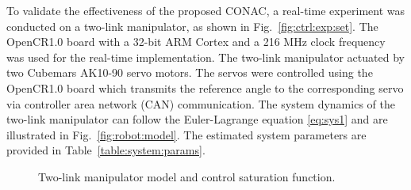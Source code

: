 \documentclass[lettersize,journal]{IEEEtran}
\begin{document}
To validate the effectiveness of the proposed CONAC, a real-time experiment was conducted on a two-link manipulator, as shown in Fig.~\ref{fig:ctrl:exp:set}. 
The OpenCR1.0 board \cite{opencr} with a 32-bit ARM Cortex and a 216 MHz clock frequency was used for the real-time implementation.
The two-link manipulator actuated by two Cubemars AK10-90 servo motors. 
The servos were controlled using the OpenCR1.0 board which transmits the reference angle to the corresponding servo via controller area network (CAN) communication.
The system dynamics of the two-link manipulator can follow the Euler-Lagrange equation \eqref{eq:sys1} and are illustrated in Fig.~\ref{fig:robot:model}. 
The estimated system parameters are provided in Table~\ref{table:system:params}. 

\begin{figure}[t]
    \centering
    \hfill
    \caption{Two-link manipulator model and control saturation function.}
    \label{fig:robot}
\end{figure}
\end{document}
